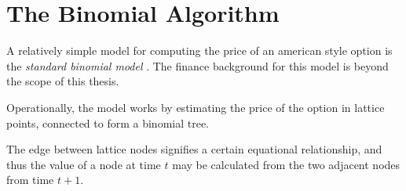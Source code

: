 \section{The Binomial Algorithm}

A relatively simple model for computing the price of an american style option
is the \emph{standard binomial model} . The finance background for this model is beyond the
scope of this thesis.

Operationally, the model works by estimating the price of the option in
lattice points, connected to form a binomial tree.


The edge between lattice nodes signifies a certain equational relationship, and
thus the value of a node at time $t$ may be calculated from the two adjacent
nodes from time $t+1$.

